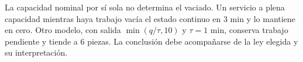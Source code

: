 La capacidad nominal por sí sola no determina el vaciado. Un servicio a plena capacidad mientras haya trabajo vacía el estado continuo en \(3\) min y lo mantiene en cero. Otro modelo, con salida \(\min(q/\tau,10)\) y \(\tau=1\) min, conserva trabajo pendiente y tiende a \(6\) piezas. La conclusión debe acompañarse de la ley elegida y su interpretación.
